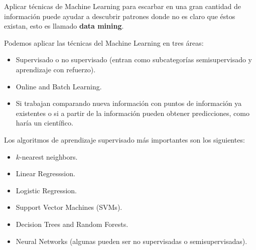 \documentclass[12pt]{report}
\newcounter{it}
\theoremstyle{largebreak}
\begin{document}

    Aplicar técnicas de Machine Learning para escarbar en una gran cantidad de información puede ayudar a descubrir patrones donde no es claro que éstos existan, esto es llamado \textbf{data mining}.

    Podemos aplicar las técnicas del Machine Learning en tres áreas:

    \begin{itemize}
        \item Supervisado o no supervisado (entran como subcategorías semisupervisado y aprendizaje con refuerzo).
        \item Online and Batch Learning.
        \item Si trabajan comparando nueva información con puntos de información ya existentes o si a partir de la información pueden obtener predicciones, como haría un científico.
    \end{itemize}

    Los algoritmos de aprendizaje supervisado más importantes son los siguientes:
    \begin{itemize}
        \item $k$-nearest neighbors.
        \item Linear Regresssion.
        \item Logistic Regression.
        \item Support Vector Machines (SVMs).
        \item Decision Trees and Random Forests.
        \item Neural Networks (algunas pueden ser no supervisadas o semisupervisadas).
    \end{itemize}
\end{document}
